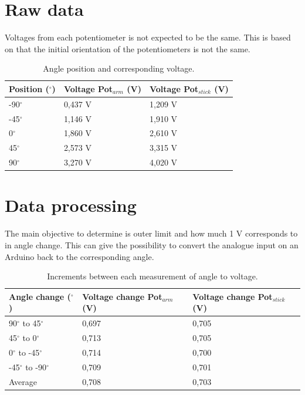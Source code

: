 \section*{Raw data}
Voltages from each potentiometer is not expected to be the same. This is based on that the initial orientation of the potentiometers is not the same. 
\begin{table}[htbp]
\centering
\begin{tabular}{lll}
\hline
Position ($^\circ$) & Voltage Pot$_{arm}$ (V) & Voltage Pot$_{stick}$ (V) \\ \hline
-90$^\circ$         & 0,437 V                 & 1,209 V                   \\
-45$^\circ$         & 1,146 V                 & 1,910 V                   \\
0$^\circ$           & 1,860 V                 & 2,610 V                   \\
45$^\circ$          & 2,573 V                 & 3,315 V                   \\
90$^\circ$          & 3,270 V                 & 4,020 V                   
\end{tabular}
\caption{Angle position and corresponding voltage.}
\label{AngleTable}
\end{table}
\section*{Data processing}
The main objective to determine is outer limit and how much 1 V corresponds to in angle change. This can give the possibility to convert the analogue input on an Arduino back to the corresponding angle. 

\begin{table}[htbp]
\centering
\begin{tabular}{lll}
\hline
Angle change ($^\circ$)    & Voltage change Pot$_{arm}$ (V) & Voltage change Pot$_{stick}$ (V) \\ \hline
90$^\circ$ to 45$^\circ$   & 0,697                          & 0,705                            \\
45$^\circ$ to 0$^\circ$    & 0,713                          & 0,705                            \\
0$^\circ$ to -45$^\circ$   & 0,714                          & 0,700                            \\
-45$^\circ$ to -90$^\circ$ & 0,709                          & 0,701                            \\
Average                    & 0,708                          & 0,703  
\end{tabular}
\caption{Increments between each measurement of angle to voltage.}
\label{IncrementsAngleToVoltage}
\end{table}

